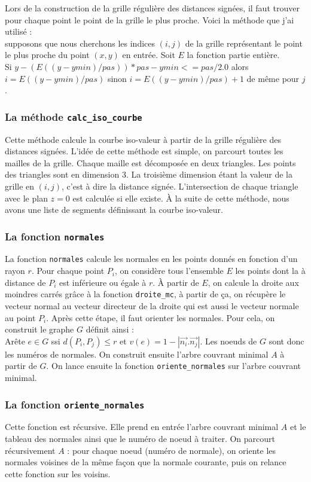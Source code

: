 \documentclass[11pt,a4paper]{article}
\begin{document}
Lors de la construction de la grille régulière des distances signées, il faut trouver pour chaque point le point de la grille le plus proche.
Voici la méthode que j'ai utilisé :\\
supposons que nous cherchons les indices $(i,j)$ de la grille représentant le point le plus proche du point $(x,y)$ en entrée. Soit $E$ la fonction
partie entière.\\ Si $y-(E((y-ymin)/pas))*pas-ymin<=pas/2.0$ alors $i=E((y-ymin)/pas)$ sinon $i=E((y-ymin)/pas)+1$ de même pour $j$.

\subsubsection{La méthode {\tt calc\_iso\_courbe}}
Cette méthode calcule la courbe iso-valeur à partir de la grille régulière des distances signées. L'idée de cette méthode est simple, on parcourt
toutes les mailles de la grille. Chaque maille est décomposée en deux triangles. Les points des triangles sont en dimension 3. La troisième dimension
étant la valeur de la grille en $(i,j)$, c'est à dire la distance signée. L'intersection de chaque triangle avec le plan $z=0$ est calculée si elle existe.
À la suite de cette méthode, nous avons une liste de segments définissant la courbe iso-valeur.

\subsubsection{La fonction {\tt normales}}
La fonction {\tt normales} calcule les normales en les points donnés en fonction d'un rayon $r$. Pour chaque point $P_i$, on considère tous l'ensemble $E$
les points dont la à distance de $P_i$ est inférieure ou égale à $r$. À partir de $E$, on calcule la droite aux moindres carrés grâce à la fonction {\tt droite\_mc}, à partir
de ça, on récupère le vecteur normal au vecteur directeur de la droite qui est aussi le vecteur normale au point $P_i$. Après cette étape, il faut orienter les normales.
Pour cela, on construit le graphe $G$ définit ainsi : \\
Arête $e \in G $ ssi $d(P_i,P_j) \leq r$ et $v(e)=1-|\vec{n_i}.\vec{n_j}|$. Les noeuds de $G$ sont donc les numéros de normales.
On construit ensuite l'arbre couvrant minimal $A$ à partir de $G$. On lance ensuite la fonction {\tt oriente\_normales} sur l'arbre couvrant minimal.

\subsubsection{La fonction {\tt oriente\_normales}}
Cette fonction est récursive. Elle prend en entrée l'arbre couvrant minimal $A$ et le tableau des normales ainsi que le numéro de noeud à traiter.
On parcourt récursivement $A$ : pour chaque noeud (numéro de normale), on oriente les normales voisines de la même façon que la normale courante, puis on
relance cette fonction sur les voisins.
\end{document}
